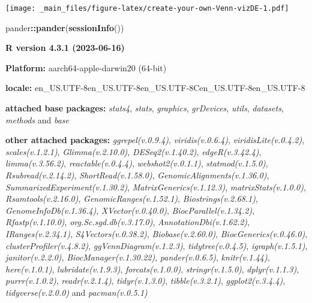 \documentclass[
]{book}
\newenvironment{Shaded}{\begin{snugshade}}{\end{snugshade}}
\newcommand{\FunctionTok}[1]{\textcolor[rgb]{0.13,0.29,0.53}{\textbf{#1}}}
\newcommand{\NormalTok}[1]{#1}
\newcommand{\SpecialCharTok}[1]{\textcolor[rgb]{0.81,0.36,0.00}{\textbf{#1}}}
\begin{document}
\texttt{[image: \_main\_files/figure-latex/create-your-own-Venn-vizDE-1.pdf]}

\begin{Shaded}
\begin{Highlighting}[]
\NormalTok{pander}\SpecialCharTok{::}\FunctionTok{pander}\NormalTok{(}\FunctionTok{sessionInfo}\NormalTok{())}
\end{Highlighting}
\end{Shaded}

\textbf{R version 4.3.1 (2023-06-16)}

\textbf{Platform:} aarch64-apple-darwin20 (64-bit)

\textbf{locale:}
en\_US.UTF-8\textbar\textbar en\_US.UTF-8\textbar\textbar en\_US.UTF-8\textbar\textbar C\textbar\textbar en\_US.UTF-8\textbar\textbar en\_US.UTF-8

\textbf{attached base packages:}
\emph{stats4}, \emph{stats}, \emph{graphics}, \emph{grDevices}, \emph{utils}, \emph{datasets}, \emph{methods} and \emph{base}

\textbf{other attached packages:}
\emph{ggrepel(v.0.9.4)}, \emph{viridis(v.0.6.4)}, \emph{viridisLite(v.0.4.2)}, \emph{scales(v.1.2.1)}, \emph{Glimma(v.2.10.0)}, \emph{DESeq2(v.1.40.2)}, \emph{edgeR(v.3.42.4)}, \emph{limma(v.3.56.2)}, \emph{reactable(v.0.4.4)}, \emph{webshot2(v.0.1.1)}, \emph{statmod(v.1.5.0)}, \emph{Rsubread(v.2.14.2)}, \emph{ShortRead(v.1.58.0)}, \emph{GenomicAlignments(v.1.36.0)}, \emph{SummarizedExperiment(v.1.30.2)}, \emph{MatrixGenerics(v.1.12.3)}, \emph{matrixStats(v.1.0.0)}, \emph{Rsamtools(v.2.16.0)}, \emph{GenomicRanges(v.1.52.1)}, \emph{Biostrings(v.2.68.1)}, \emph{GenomeInfoDb(v.1.36.4)}, \emph{XVector(v.0.40.0)}, \emph{BiocParallel(v.1.34.2)}, \emph{Rfastp(v.1.10.0)}, \emph{org.Sc.sgd.db(v.3.17.0)}, \emph{AnnotationDbi(v.1.62.2)}, \emph{IRanges(v.2.34.1)}, \emph{S4Vectors(v.0.38.2)}, \emph{Biobase(v.2.60.0)}, \emph{BiocGenerics(v.0.46.0)}, \emph{clusterProfiler(v.4.8.2)}, \emph{ggVennDiagram(v.1.2.3)}, \emph{tidytree(v.0.4.5)}, \emph{igraph(v.1.5.1)}, \emph{janitor(v.2.2.0)}, \emph{BiocManager(v.1.30.22)}, \emph{pander(v.0.6.5)}, \emph{knitr(v.1.44)}, \emph{here(v.1.0.1)}, \emph{lubridate(v.1.9.3)}, \emph{forcats(v.1.0.0)}, \emph{stringr(v.1.5.0)}, \emph{dplyr(v.1.1.3)}, \emph{purrr(v.1.0.2)}, \emph{readr(v.2.1.4)}, \emph{tidyr(v.1.3.0)}, \emph{tibble(v.3.2.1)}, \emph{ggplot2(v.3.4.4)}, \emph{tidyverse(v.2.0.0)} and \emph{pacman(v.0.5.1)}
\end{document}
